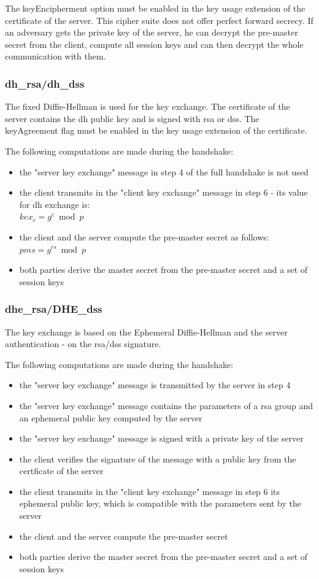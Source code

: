 The keyEncipherment option must be enabled in the key usage extension of the certificate of the server.
This cipher suite does not offer perfect forward secrecy. If an adversary gets the private key of the server, he can decrypt the pre-master secret from the client, compute all session keys and can then decrypt the whole communication with them.

\subsubsection*{\gls{dh}\_\gls{rsa}/\gls{dh}\_\gls{dss}}
The fixed Diffie-Hellman is used for the key exchange. The certificate of the server contains the \gls{dh} public key and is signed with \gls{rsa} or \gls{dss}.
The keyAgreement flag must be enabled in the key usage extension of the certificate.

The following computations are made during the handshake:
\begin{itemize}
	\item the "server key exchange" message in step 4 of the full handshake is not used
	\item the client transmits in the "client key exchange" message in step 6 - its value for \gls{dh} exchange is: \\ $\displaystyle kex_c = g^c \bmod p $ 
	\item the client and the server compute the pre-master secret as follows: $\displaystyle pms = g^{cs} \bmod p$
	\item both parties derive the master secret from the pre-master secret and a set of session keys
\end{itemize}

\subsubsection*{\gls{dhe}\_\gls{rsa}/DHE\_\gls{dss}}
The key exchange is based on the Ephemeral Diffie-Hellman and the server authentication - on the \gls{rsa}/\gls{dss} signature.

The following computations are made during the handshake:
\begin{itemize}
	\item the "server key exchange" message is transmitted by the server in step 4
	\item the "server key exchange" message contains the parameters of a \gls{rsa} group and an ephemeral public key computed by the server
	\item the "server key exchange" message is signed with a private key of the server
	\item the client verifies the signature of the message with a public key from the certficate of the server
	\item the client transmits in the "client key exchange" message in step 6 its ephemeral public key, which is compatible with the parameters sent by the server
	\item the client and the server compute the pre-master secret
	\item both parties derive the master secret from the pre-master secret and a set of session keys
\end{itemize}

